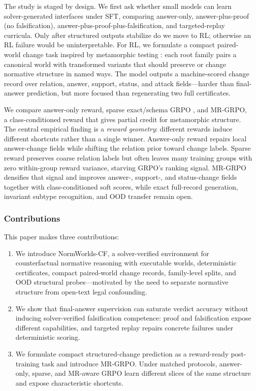 \documentclass[letterpaper]{article}
\newcommand{\method}{MR-GRPO}
\newcommand{\dataset}{NormWorlds-CF}
\begin{document}
The study is staged by design. We first ask whether small models can learn solver-generated interfaces under SFT, comparing answer-only, answer-plus-proof (no falsification), answer-plus-proof-plus-falsification, and targeted-replay curricula. Only after structured outputs stabilize do we move to RL; otherwise an RL failure would be uninterpretable. For RL, we formulate a compact paired-world change task inspired by metamorphic testing \cite{chen1998metamorphic,chen2018metamorphic}: each root family pairs a canonical world with transformed variants that should preserve or change normative structure in named ways. The model outputs a machine-scored change record over relation, answer, support, status, and attack fields---harder than final-answer prediction, but more focused than regenerating two full certificates.

We compare answer-only reward, sparse exact/schema GRPO \cite{shao2024deepseekmath,deepseekai2025r1}, and \method{}, a class-conditioned reward that gives partial credit for metamorphic structure. The central empirical finding is a \emph{reward geometry}: different rewards induce different shortcuts rather than a single winner. Answer-only reward repairs local answer-change fields while shifting the relation prior toward change labels. Sparse reward preserves coarse relation labels but often leaves many training groups with zero within-group reward variance, starving GRPO's ranking signal. \method{} densifies that signal and improves answer-, support-, and status-change fields together with class-conditioned soft scores, while exact full-record generation, invariant subtype recognition, and OOD transfer remain open.

\subsubsection{Contributions}
This paper makes three contributions:
\begin{enumerate}
\item We introduce \dataset, a solver-verified environment for counterfactual normative reasoning with executable worlds, deterministic certificates, compact paired-world change records, family-level splits, and OOD structural probes---motivated by the need to separate normative structure from open-text legal confounding.
\item We show that final-answer supervision can saturate verdict accuracy without inducing solver-verified falsification competence: proof and falsification expose different capabilities, and targeted replay repairs concrete failures under deterministic scoring.
\item We formulate compact structured-change prediction as a reward-ready post-training task and introduce \method. Under matched protocols, answer-only, sparse, and MR-aware GRPO learn different slices of the same structure and expose characteristic shortcuts.
\end{enumerate}
\end{document}
